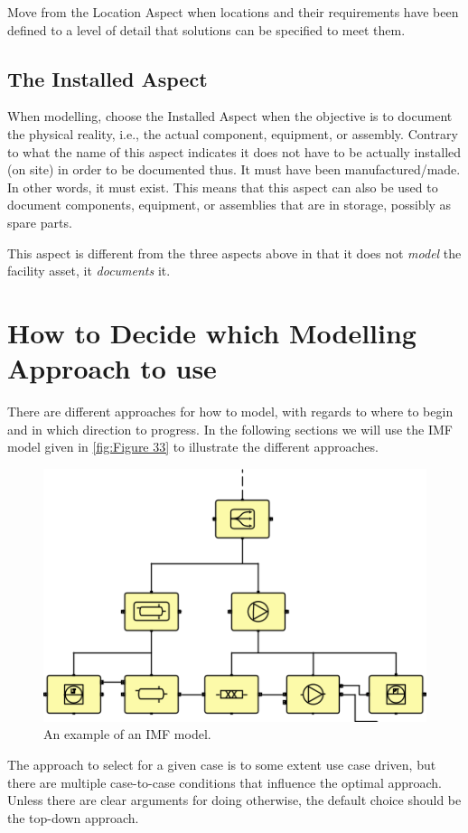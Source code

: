 \documentclass[../main.tex]{subfiles}
\begin{document}
Move from the Location Aspect when locations and their requirements have been defined to a level of detail that
solutions can be specified to meet them.

\subsection{The Installed Aspect}
When modelling, choose the Installed Aspect when the objective is to document the physical
reality, i.e., the actual component, equipment, or assembly. Contrary to what the name of this aspect indicates it
does not have to be actually installed (on site) in order to be documented thus. It must have been manufactured/made.
In other words, it must exist. This means that this aspect can also be used to document components, equipment,
or assemblies that are in storage, possibly as spare parts.

This aspect is different from the three aspects above in that it does not \emph{model} the facility asset, it
\emph{documents} it.

\section{How to Decide which Modelling
  Approach to use}
\label{ch:Chapter 5.4}
There are different approaches for how to model, with regards to where to begin and in
which direction to progress. In the following sections we will use the IMF model given in \autoref{fig:Figure 33} to illustrate the
different approaches.

\begin{figure}[htb]
  \centering
  \includegraphics[width=.5\textwidth]{img/IMFmanual-img052.png}
  \caption{An example of an IMF model.}
  \label{fig:Figure 33}
\end{figure}

The approach to select for a given case is to some extent use case driven, but there are multiple case-to-case
conditions that influence the optimal approach. Unless there are clear arguments for doing otherwise, the default
choice should be the top-down approach.
\end{document}
